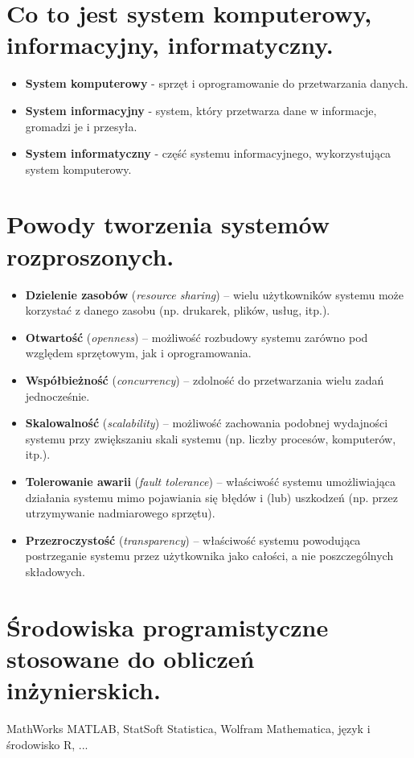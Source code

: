 \documentclass[12pt,a4paper]{article}
\begin{document}
	\section{Co to jest system komputerowy, informacyjny, informatyczny.}
	\begin{itemize}	
		\item \textbf{System komputerowy} - sprzęt i oprogramowanie do przetwarzania danych. 
		\item \textbf{System informacyjny} - system, który przetwarza dane w informacje, gromadzi je i przesyła. 
		\item \textbf{System informatyczny} - część systemu informacyjnego, wykorzystująca system komputerowy.
	\end{itemize}

	\section{Powody tworzenia systemów rozproszonych.}
	\begin{itemize}
		\item \textbf{Dzielenie zasobów} (\textit{resource sharing}) – wielu użytkowników systemu może korzystać z danego zasobu (np. drukarek, plików, usług, itp.).
		
		\item \textbf{Otwartość} (\textit{openness}) – możliwość rozbudowy systemu zarówno pod względem sprzętowym, jak i oprogramowania.
		
		\item \textbf{Współbieżność} (\textit{concurrency}) – zdolność do przetwarzania wielu zadań jednocześnie.
		
		\item \textbf{Skalowalność} (\textit{scalability}) – możliwość zachowania podobnej wydajności systemu przy zwiększaniu skali systemu (np. liczby procesów, komputerów, itp.).
		
		\item \textbf{Tolerowanie awarii} (\textit{fault tolerance}) – właściwość systemu umożliwiająca działania systemu mimo pojawiania się błędów i (lub) uszkodzeń (np. przez utrzymywanie nadmiarowego sprzętu).
		
		\item \textbf{Przezroczystość} (\textit{transparency}) – właściwość systemu powodująca postrzeganie systemu przez użytkownika jako całości, a nie poszczególnych składowych.
	\end{itemize}

	\section{Środowiska programistyczne stosowane do obliczeń inżynierskich.}
	MathWorks MATLAB, StatSoft Statistica,  Wolfram Mathematica, język i środowisko R, ...
\end{document}
